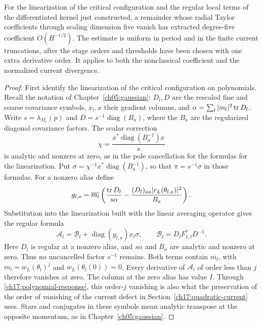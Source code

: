 \begin{proposition}
\label{ch17:spatial-moments}
For the linearization of the critical configuration and the regular local terms of the differentiated kernel just constructed,
a remainder whose radial Taylor coefficients through scaling dimension five vanish
has extracted degree-five coefficient $O(H^{-1/2})$. The estimate is
uniform in period and in the finite current truncations, after the
stage orders and thresholds have been chosen with one extra derivative
order. It applies to both the nonclassical coefficient and the
normalized current divergence.
\end{proposition}
\begin{proof}
First identify the linearization of the critical configuration on polynomials. Recall the notation of
Chapter~\ref{ch05:gaussian}: $D_l,D$ are the rescaled fine and coarse
covariance symbols, $x_l,x$ their gradient columns, and
$\alpha=\sum_l|m_l|^2\operatorname{tr} D_l$.
Write $s=\lambda_{M_c}(p)$ and
$D=s^{-1}\operatorname{diag}(B_a)$, where the $B_a$ are the
regularized diagonal covariance factors. The scalar correction
\[
 \chi=\frac{x^*\operatorname{diag}(B_a^{-1})x}{s}
\]
is analytic and nonzero at zero, as in the pole cancellation for the
formulas for the linearization. Put
$\sigma=\chi^{-1}x^*\operatorname{diag}(B_a^{-1})$, so that
$\pi=s^{-1}\sigma$ in those formulas. For a nonzero alias define
\[
 g_{l,a}=\overline{m_l}
 \left(\frac{\operatorname{tr} D_l}{s\alpha}
       -\frac{(D_l)_{aa}|r_L(\theta_{l,a})|^2}{B_a}\right).
\]
Substitution into the linearization built with the linear averaging operator gives the regular formula
\[
 \mathcal A_l=\mathcal B_l+
          \operatorname{diag}(g_{l,a})x_l\sigma,
 \qquad \mathcal B_l=D_lF_{1,l}^*D^{-1}.
\]
Here $D_l$ is regular at a nonzero alias, and $s\alpha$ and
$B_a$ are analytic and nonzero at zero. Thus no uncancelled factor
$s^{-1}$ remains. Both terms contain $\overline{m_l}$, with
$m_l=w_L(\theta_l)^j$ and $w_L(\theta_l(0))=0$.
Every derivative of $\mathcal A_l$ of order less than $j$ therefore
vanishes at zero. The column at the zero alias has value $I$. Through \eqref{ch17:polynomial-response}, this
order-$j$ vanishing is also what the preservation of the order of vanishing of the
current defect in Section~\ref{ch17:quadratic-current} uses. Stars and conjugates in these symbols mean analytic
transpose at the opposite momentum, as in Chapter~\ref{ch05:gaussian}.


\end{proof}
